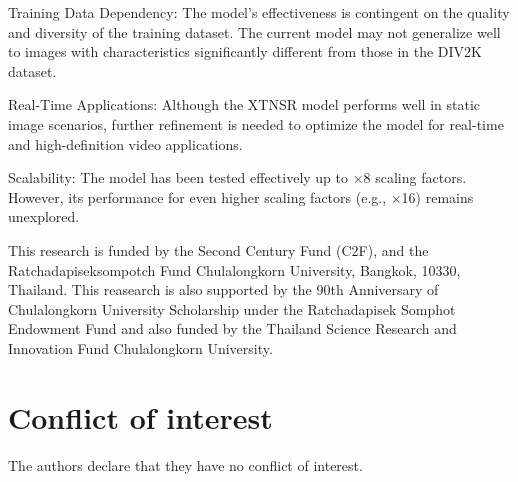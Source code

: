\documentclass[twocolumn]{svjour3}          %
\begin{document}
Training Data Dependency: The model's effectiveness is contingent on the quality and diversity of the training dataset. The current model may not generalize well to images with characteristics significantly different from those in the DIV2K dataset.

Real-Time Applications: Although the XTNSR model performs well in static image scenarios, further refinement is needed to optimize the model for real-time and high-definition video applications.

Scalability: The model has been tested effectively up to ×8 scaling factors. However, its performance for even higher scaling factors (e.g., ×16) remains unexplored.

\begin{acknowledgements}
This research is funded by the Second Century Fund (C2F), and the Ratchadapiseksompotch Fund Chulalongkorn University, Bangkok, 10330, Thailand. This reasearch is also supported by the 90th Anniversary of Chulalongkorn University Scholarship under the Ratchadapisek Somphot Endowment Fund and also funded by the Thailand Science Research and Innovation Fund Chulalongkorn University.
\end{acknowledgements}

\section*{Conflict of interest}
 The authors declare that they have no conflict of interest.
\end{document}
